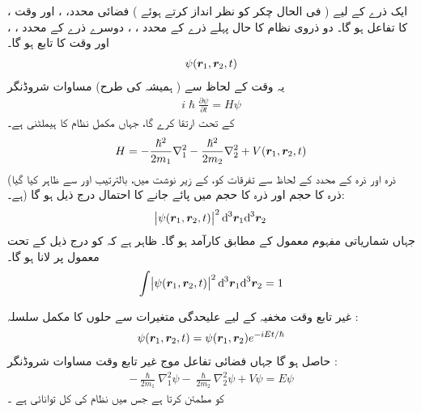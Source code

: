 ایک ذرے کے لیے ( فی الحال چکر کو نظر انداز کرتے ہوئے )       فضائی  محدد، ،  اور وقت  ،  کا تفاعل ہو گا۔ دو ذروی نظام کا حال پہلے ذرے کے محدد ، ،  دوسرے ذرے کے محدد ، ،  اور وقت کا تابع ہو گا۔ 
\begin{align}   
\psi ( {{\boldsymbol{r}}}_1 , {{\boldsymbol{r}}}_2 , t ) 
\end{align}
  یہ وقت کے لحاظ سے  ( ہمیشہ کی طرح) مساوات شروڈنگر 
\begin{align}
i \hslash \frac{ \partial \psi }{ \partial t } = H \psi
\end{align}
کے تحت ارتقا کرے گا،  جہاں  مکمل  نظام کا ہیملٹنی  ہے۔
\begin{equation}
H = - \frac{ \hslash^2 }{ 2 m_1 } \nabla_1^2  -  \frac{ \hslash^2 }{ 2 m_2 }  \nabla_2^2 +  V({{\boldsymbol{r}}}_1 , {{\boldsymbol{r}}}_2 , t )
\end{equation}
(ذرہ    اور  ذرہ     کے محدد کے لحاظ سے  تفرقات  کو،    کے  زیر نوشت میں، بالترتیب    اور      سے ظاہر کیا گیا ہے۔)   ذرہ    کا
 حجم   اور ذرہ    کا حجم  میں  پائے جانے کا احتمال درج ذیل ہو گا:
\begin{align}
\abs{\psi (\kvec{r}_1 , \kvec{r}_2 , t ) }^2  {\dif^{\,3} } { \kvec{r}_1 }  {\dif^{\,3} } { \kvec{r}_2 }
\end{align}
جہاں شماریاتی مفہوم   معمول کے مطابق کارآمد ہو گا۔ ظاہر ہے کہ   کو درج ذیل کے تحت  معمول پر لانا ہو گا۔ 
\begin{align}
\int \abs{\psi ( \kvec{r}_1 , \kvec{r}_2 , t ) }^2 {\dif^{\,3} } {\kvec{r}_1 } {\dif^{\,3} } { \kvec{r}_2 } = 1
\end{align}

غیر تابع وقت مخفیہ کے لیے علیحدگی  متغیرات  سے حلوں کا   مکمل سلسلہ :
\begin{align}
\psi ( {{\boldsymbol{r}}}_1 , {{\boldsymbol{r}}}_2 , t ) =  \psi ( {{\boldsymbol{r}}}_1 , {{\boldsymbol{r}}}_2 ) {e}^{-i E t/\hslash}  
\end{align}
حاصل ہو گا جہاں فضائی  تفاعل موج   غیر تابع وقت مساوات شروڈنگر :
\begin{align}
-\frac{ \hslash }{ 2 m_1 }  {\nabla_1^2} { \psi } - \frac{ \hslash }{ 2 m_2 } \nabla_2^2 { \psi } + V \psi =E\psi
\end{align}
کو مطمئن کرتا ہے جس میں    نظام کی کل توانائی ہے ۔ 


